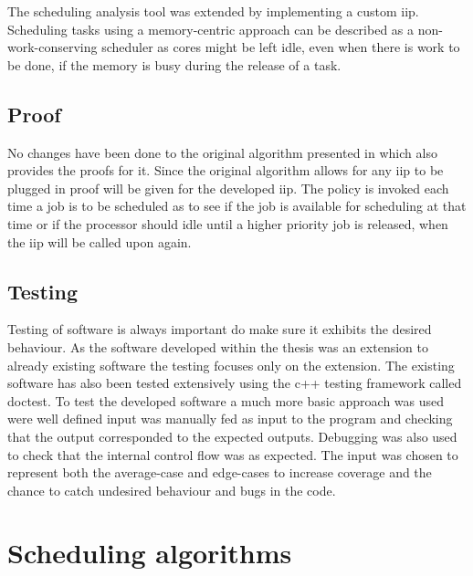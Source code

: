 \documentclass{kththesis}
\begin{document}
The scheduling analysis tool was extended by implementing a custom \acrshort{iip}. Scheduling tasks
using a memory-centric approach can be described as a non-work-conserving scheduler as cores might be
left idle, even when there is work to be done, if the memory is busy during the release of a task. 


\subsection{Proof}

No changes have been done to the original algorithm presented in \parencite{nasri_exact_2017} which
also provides the proofs for it. Since the original algorithm allows for any \acrshort{iip} to be
plugged in proof will be given for the developed \acrshort{iip}. The policy is invoked each time a
job is to be scheduled as to see if the job is available for scheduling at that time or if the
processor should idle until a higher priority job is released, when the \acrshort{iip} will be
called upon again.

%
%



\subsection{Testing}

Testing of software is always important do make sure it exhibits the desired behaviour. As the
software developed within the thesis was an extension to already existing software the testing
focuses only on the extension. The existing software has also been tested extensively using the c++
testing framework called doctest. To test the developed software a much more basic approach was used
were well defined input was manually fed as input to the program and checking that the output
corresponded to the expected outputs. Debugging was also used to check that the internal control
flow was as expected. The input was chosen to represent both the average-case and edge-cases to
increase coverage and the chance to catch undesired behaviour and bugs in the code.


\section{Scheduling algorithms} \label{sec:scheduling_algorithms}
\end{document}
